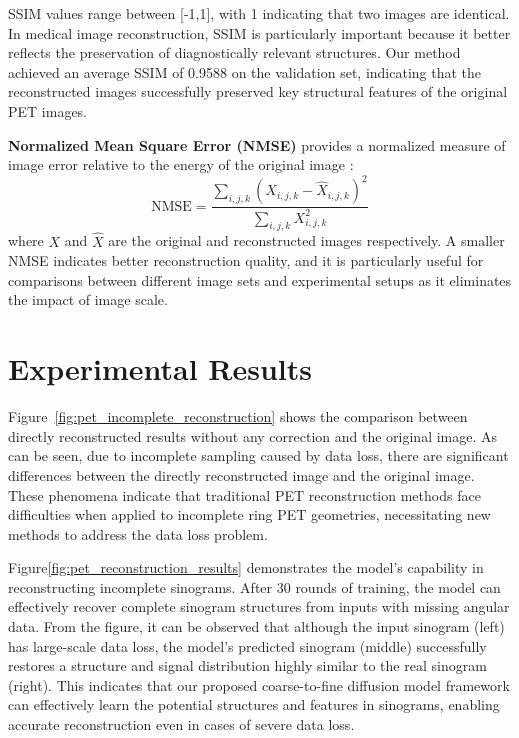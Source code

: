 \documentclass[
reprint,
superscriptaddress,
nofootinbib,
amsmath,amssymb,
aps,
prd,
]{revtex4-2}
\begin{document}
SSIM values range between [-1,1], with 1 indicating that two images are identical. In medical image reconstruction, SSIM is particularly important because it better reflects the preservation of diagnostically relevant structures. Our method achieved an average SSIM of 0.9588 on the validation set, indicating that the reconstructed images successfully preserved key structural features of the original PET images.

\textbf{Normalized Mean Square Error (NMSE)} provides a normalized measure of image error relative to the energy of the original image \cite{Higashiyama2024NMSE}:
\begin{equation}
\text{NMSE} = \frac{\sum_{i,j,k}(X_{i,j,k} - \hat{X}_{i,j,k})^2}{\sum_{i,j,k}X_{i,j,k}^2}
\end{equation}
where $X$ and $\hat{X}$ are the original and reconstructed images respectively. A smaller NMSE indicates better reconstruction quality, and it is particularly useful for comparisons between different image sets and experimental setups as it eliminates the impact of image scale.




\section{Experimental Results}

\label{chap:results}





Figure~\ref{fig:pet_incomplete_reconstruction} shows the comparison between directly reconstructed results without any correction and the original image. As can be seen, due to incomplete sampling caused by data loss, there are significant differences between the directly reconstructed image and the original image. These phenomena indicate that traditional PET reconstruction methods face difficulties when applied to incomplete ring PET geometries, necessitating new methods to address the data loss problem.

Figure\ref{fig:pet_reconstruction_results} demonstrates the model's capability in reconstructing incomplete sinograms. After 30 rounds of training, the model can effectively recover complete sinogram structures from inputs with missing angular data. From the figure, it can be observed that although the input sinogram (left) has large-scale data loss, the model's predicted sinogram (middle) successfully restores a structure and signal distribution highly similar to the real sinogram (right). This indicates that our proposed coarse-to-fine diffusion model framework can effectively learn the potential structures and features in sinograms, enabling accurate reconstruction even in cases of severe data loss.
\end{document}
